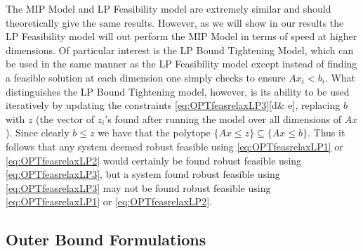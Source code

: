 \documentclass[11pt]{article}
\theoremstyle{plain}
\theoremstyle{definition}
\theoremstyle{remark}
\begin{document}
The MIP Model and LP Feasibility model are extremely similar and should theoretically give the same results. However, as we will show in our results the LP Feasibility model will out perform the MIP Model in terms of speed at higher dimensions. Of particular interest is the LP Bound Tightening Model, which can be used in the same manner as the LP Feasibility model except instead of finding a feasible solution at each dimension one simply checks to ensure $Ax_i <b_i$. What distinguishes the LP Bound Tightening model, however, is its ability to be used iteratively by updating the constraints \eqref{eq:OPTfeasrelaxLP3}[d\& e], replacing $b$ with $z$ (the vector of $z_i$'s found after running the model over all dimensions of $Ax$). Since clearly $b\leq z$ we have that the polytope $\{Ax\leq z\}\subseteq\{Ax\leq b\}$. Thus it follows that any system deemed robust feasible using \eqref{eq:OPTfeasrelaxLP1} or \eqref{eq:OPTfeasrelaxLP2} would certainly be found robust feasible using \eqref{eq:OPTfeasrelaxLP3}, but a system found robust feasible using \eqref{eq:OPTfeasrelaxLP3} may not be found robust feasible using \eqref{eq:OPTfeasrelaxLP1} or \eqref{eq:OPTfeasrelaxLP2}. 


\subsection{Outer Bound Formulations}
\end{document}
